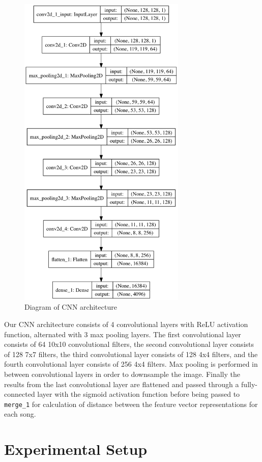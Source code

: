 \begin{figure}[H]
\centering
\includegraphics[width=8cm]{figures/conv_net.png}
\caption{Diagram of CNN architecture}
\end{figure}

Our CNN architecture consists of 4 convolutional layers with ReLU activation function, alternated with 3 max pooling layers. The first convolutional layer consists of 64 10x10 convolutional filters, the second convolutional layer consists of 128 7x7 filters, the third convolutional layer consists of 128 4x4 filters, and the fourth convolutional layer consists of 256 4x4 filters. Max pooling is performed in between convolutional layers in order to downsample the image. Finally the results from the last convolutional layer are flattened and passed through a fully-connected layer with the sigmoid activation function before being passed to \texttt{merge\_1} for calculation of distance between the feature vector representations for each song.



\section{Experimental Setup}

